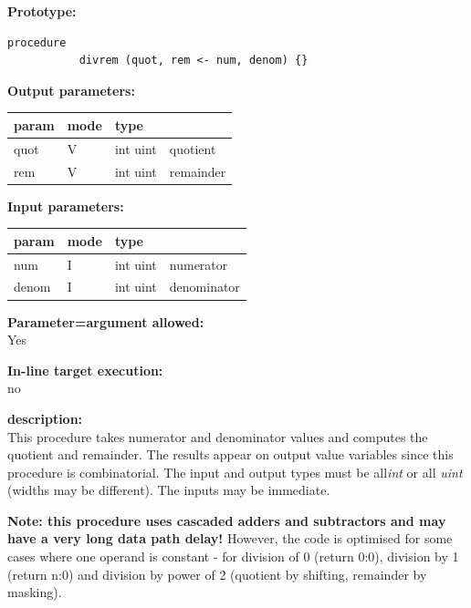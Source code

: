         {\bf Prototype:} \\
        \vsp
        \begin{lstlisting}[gobble=8, language=threepl]
           procedure
           divrem (quot, rem <- num, denom) {}
        \end{lstlisting}
        
        {\bf Output parameters:} \\
        \begin{tabular}{| l | l | l | l |}
        \hline
        param  & mode     & type  & \\
        \hline \hline
        quot   & V & int uint & quotient    \\ \hline
        rem    & V & int uint & remainder   \\ \hline
        \end{tabular}
        
        {\bf Input parameters:} \\
        \begin{tabular}{| l | l | l | l |}
        \hline
        param  & mode     & type  & \\
        \hline \hline
        num    & I & int uint & numerator   \\ \hline
        denom  & I & int uint & denominator \\ \hline
        \end{tabular}
        
        {\bf Parameter=argument allowed:} \\
        Yes

        {\bf In-line target execution:} \\
        no

        {\bf description:} \\
        This procedure takes numerator and denominator values and
        computes the quotient and remainder. The results appear on
        output value variables since this procedure is combinatorial.
        The input and output types must be all{\em int} or all {\em uint}
        (widths may be different). The inputs may be immediate.

        {\bf Note: this procedure uses cascaded adders and subtractors
        and may have a very long data path delay!} However, the code is
        optimised for some cases where one operand is constant -  for
        division of 0 (return 0:0), division by 1 (return n:0) and
        division by power of 2 (quotient by shifting, remainder by
        masking).




